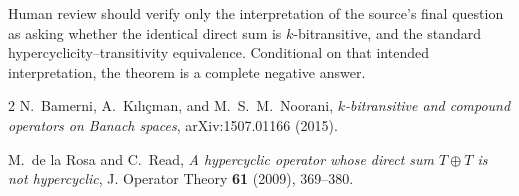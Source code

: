 \documentclass[11pt]{article}
\begin{document}
Human review should verify only the interpretation of the source's final
question as asking whether the identical direct sum is $k$-bitransitive,
and the standard hypercyclicity--transitivity equivalence.  Conditional on
that intended interpretation, the theorem is a complete negative answer.

\begin{thebibliography}{2}
N.~Bamerni, A.~K\i l\i\c cman, and M.~S.~M.~Noorani,
\newblock \emph{$k$-bitransitive and compound operators on Banach spaces},
\newblock arXiv:1507.01166 (2015).

M.~de la Rosa and C.~Read,
\newblock \emph{A hypercyclic operator whose direct sum $T\oplus T$ is
not hypercyclic},
\newblock J. Operator Theory \textbf{61} (2009), 369--380.
\end{thebibliography}
\end{document}
